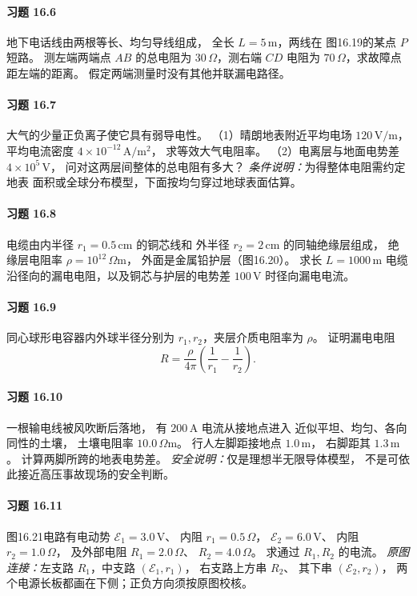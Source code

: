 \paragraph{习题 16.6}
地下电话线由两根等长、均匀导线组成，
全长 \(L=5\,\mathrm m\)，两线在
图16.19的某点 \(P\) 短路。
测左端两端点 \(AB\) 的总电阻为
\(30\,\Omega\)，测右端 \(CD\) 电阻为
\(70\,\Omega\)，求故障点距左端的距离。
假定两端测量时没有其他并联漏电路径。

\paragraph{习题 16.7}
大气的少量正负离子使它具有弱导电性。
（1）晴朗地表附近平均电场
\(120\,\mathrm{V/m}\)，平均电流密度
\(4\times10^{-12}\,\mathrm{A/m^2}\)，
求等效大气电阻率。
（2）电离层与地面电势差
\(4\times10^5\,\mathrm V\)，
问对这两层间整体的总电阻有多大？
\textit{条件说明：}为得整体电阻需约定地表
面积或全球分布模型，下面按均匀穿过地球表面估算。

\paragraph{习题 16.8}
电缆由内半径
\(r_1=0.5\,\mathrm{cm}\) 的铜芯线和
外半径 \(r_2=2\,\mathrm{cm}\) 的同轴绝缘层组成，
绝缘层电阻率
\(\rho=10^{12}\,\Omega\mathrm m\)，
外面是金属铅护层（图16.20）。
求长 \(L=1000\,\mathrm m\) 电缆
沿径向的漏电电阻，以及铜芯与护层的电势差
\(100\,\mathrm V\) 时径向漏电电流。

\paragraph{习题 16.9}
同心球形电容器内外球半径分别为
\(r_1,r_2\)，夹层介质电阻率为 \(\rho\)。
证明漏电电阻
\[
 R=\frac{\rho}{4\pi}
 \left(\frac1{r_1}-\frac1{r_2}\right).
\]

\paragraph{习题 16.10}
一根输电线被风吹断后落地，
有 \(200\,\mathrm A\) 电流从接地点进入
近似平坦、均匀、各向同性的土壤，
土壤电阻率 \(10.0\,\Omega\mathrm m\)。
行人左脚距接地点 \(1.0\,\mathrm m\)，
右脚距其 \(1.3\,\mathrm m\)。
计算两脚所跨的地表电势差。
\textit{安全说明：}仅是理想半无限导体模型，
不是可依此接近高压事故现场的安全判断。

\paragraph{习题 16.11}
图16.21电路有电动势
\(\mathcal E_1=3.0\,\mathrm V\)、
内阻 \(r_1=0.5\,\Omega\)，
\(\mathcal E_2=6.0\,\mathrm V\)、
内阻 \(r_2=1.0\,\Omega\)，
及外部电阻 \(R_1=2.0\,\Omega\)、
\(R_2=4.0\,\Omega\)。
求通过 \(R_1,R_2\) 的电流。
\textit{原图连接：}左支路 \(R_1\)，中支路
\((\mathcal E_1,r_1)\)，
右支路上方串 \(R_2\)、
其下串 \((\mathcal E_2,r_2)\)，
两个电源长板都画在下侧；正负方向须按原图校核。

